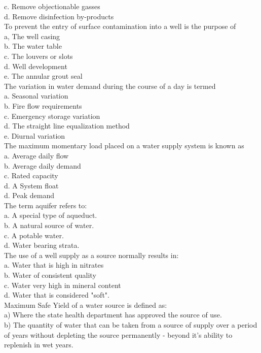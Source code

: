 c. Remove objectionable gasses\\
d. Remove disinfection by-products\\
To prevent the entry of surface contamination into a well is the purpose of\\
a, The well casing\\
b. The water table\\
c. The louvers or slots\\
d. Well development\\
e. The annular grout seal\\
The variation in water demand during the course of a day is termed\\
a. Seasonal variation\\
b. Fire flow requirements\\
c. Emergency storage variation\\
d. The straight line equalization method\\
e. Diurnal variation\\
The maximum momentary load placed on a water supply system is known as\\
a. Average daily flow\\
b. Average daily demand\\
c. Rated capacity\\
d. A System float\\
d. Peak demand\\
The term aquifer refers to:\\
a. A special type of aqueduct.\\
b. A natural source of water.\\
c. A potable water.\\
d. Water bearing strata.\\
The use of a well supply as a source normally results in:\\
a. Water that is high in nitrates\\
b. Water of consistent quality\\
c. Water very high in mineral content\\
d. Water that is considered "soft".\\
Maximum Safe Yield of a water source is defined as:\\
a) Where the state health department has approved the source of use.\\
b) The quantity of water that can be taken from a source of supply over a period of years without depleting the source permanently - beyond it's ability to replenish in wet years.\\
